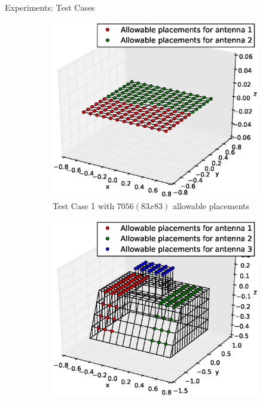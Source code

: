 \documentclass{beamer}
\begin{document}
    \begin{frame}{Experiments: Test Cases}
        \begin{figure}
            \centering
            \begin{subfigure}{.5\columnwidth}
                \includegraphics[width=\columnwidth,height=\columnwidth]{../paper/FIG/tc_1_figure}%
                \caption{\tiny Test Case 1 with $7056 (83x83)$ allowable placements}%
                \label{fig:tc1_figure}%
            \end{subfigure}\hfill%
            \begin{subfigure}{.5\columnwidth}
                \includegraphics[width=\columnwidth, height=\columnwidth]{../paper/FIG/tc_2_figure}%

\end{subfigure}
\end{figure}
\end{frame}
\end{document}
